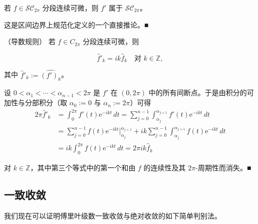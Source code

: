 \begin{remark}

\begin{items}
\item

若 $ f \in \mathcal{SC}_{2\pi} $ 分段连续可微，则 $ f' $ 属于 $ \mathcal{SC}_{2\pi} $。

\proofhead
这是区间边界上规范化定义的一个直接推论。\nobreak\hspace{0.35em}■
\item

（导数规则）  若 $ f \in C_{2\pi} $ 分段连续可微，则

\[
\hat{f}'_{k} = ik\hat{f}_{k} \quad \text{对 } k \in \mathbb{Z} ,
\]

其中 $ \hat{f}'_{k} := \widehat{(f')_{k}} $。

\proofhead
设 $ 0 < \alpha_{1} < \cdots < \alpha_{n-1} < 2\pi $ 是 $ f' $ 在 $ (0, 2\pi) $ 中的所有间断点。于是由积分的可加性与分部积分（取 $ \alpha_{0} := 0 $ 与 $ \alpha_{n} := 2\pi $）可得
\begin{equation*}
\begin{aligned}
2\pi\hat{f}'_{k} &= \int_{0}^{2\pi} f'(t)\mathrm{e}^{-ikt} \, dt = \sum_{j=0}^{n-1}\int_{\alpha_{j}}^{\alpha_{j+1}} f'(t)\mathrm{e}^{-ikt} \, dt \\ &= \sum_{j=0}^{n-1} f(t)\mathrm{e}^{-ikt}\big|_{\alpha_{j}}^{\alpha_{j+1}} + ik\sum_{j=0}^{n-1}\int_{\alpha_{j}}^{\alpha_{j+1}} f(t)\mathrm{e}^{-ikt} \, dt \\ &= ik\int_{0}^{2\pi} f(t)\mathrm{e}^{-ikt} \, dt = 2\pi ik\hat{f}_{k}
\end{aligned}
\end{equation*}

对 $ k \in \mathbb{Z} $，其中第三个等式中的第一个和由 $ f $ 的连续性及其 $ 2\pi $-周期性而消失。\nobreak\hspace{0.35em}■

\end{items}

\end{remark}

\subsection*{一致收敛}

我们现在可以证明傅里叶级数一致收敛与绝对收敛的如下简单判别法。

